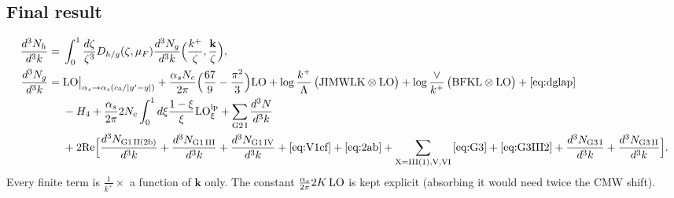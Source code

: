 \documentclass[10pt]{article}
\numberwithin{equation}{section}
\newcommand{\LO}{{\rm LO}}
\begin{document}
\subsection{Final result}
\begin{align}
\frac{d^3N_h}{d^3k}={}&\int_0^1\frac{d\zeta}{\zeta^3}D_{h/g}(\zeta,\mu_F)\frac{d^3N_g}{d^3k}\Big(\frac{k^+}{\zeta},\frac{\mathbf k}{\zeta}\Big),\notag\\
\frac{d^3N_g}{d^3k}={}&\LO\big|_{\alpha_s\to\alpha_s(c_0/|y'-y|)}+\frac{\alpha_sN_c}{2\pi}\Big(\frac{67}{9}-\frac{\pi^2}{3}\Big)\LO+\log\frac{k^+}{\Lambda}\,\big(\text{JIMWLK}\otimes\LO\big)+\log\frac{\vee}{k^+}\,\big(\text{BFKL}\otimes\LO\big)+\eqref{eq:dglap}\notag\\
&-H_4+\frac{\alpha_s}{2\pi}2N_c\int_0^1d\xi\frac{1-\xi}{\xi}\LO^{\rm lp}_\xi+\sum_{\rm G2\,I}\frac{d^3N}{d^3k}\notag\\
&+2{\rm Re}\Big[\frac{d^3N_{\rm G1\,II(2b)}}{d^3k}+\frac{d^3N_{\rm G1\,III}}{d^3k}+\frac{d^3N_{\rm G1\,IV}}{d^3k}+\eqref{eq:V1cf}+\eqref{eq:2ab}+\sum_{\rm X=III(1),V,VI}\eqref{eq:G3}+\eqref{eq:G3III2}+\frac{d^3N_{\rm G3\,I}}{d^3k}+\frac{d^3N_{\rm G3\,II}}{d^3k}\Big].\label{eq:final}
\end{align}
Every finite term is $\frac{1}{k^+}\times$ a function of $\mathbf k$ only. The constant $\frac{\alpha_s}{2\pi}2K\,\LO$ is kept explicit (absorbing it would need twice the CMW shift).
\end{document}
